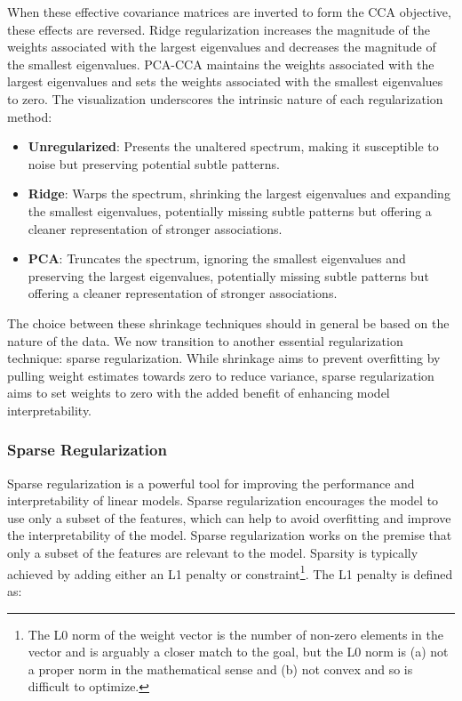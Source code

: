 When these effective covariance matrices are inverted to form the CCA objective, these effects are reversed.
Ridge regularization increases the magnitude of the weights associated with the largest eigenvalues and decreases the magnitude of the smallest eigenvalues.
PCA-CCA maintains the weights associated with the largest eigenvalues and sets the weights associated with the smallest eigenvalues to zero.
The visualization underscores the intrinsic nature of each regularization method:
\begin{itemize}
    \item \textbf{Unregularized}: Presents the unaltered spectrum, making it susceptible to noise but preserving potential subtle patterns.
    \item \textbf{Ridge}: Warps the spectrum, shrinking the largest eigenvalues and expanding the smallest eigenvalues, potentially missing subtle patterns but offering a cleaner representation of stronger associations.
    \item \textbf{PCA}: Truncates the spectrum, ignoring the smallest eigenvalues and preserving the largest eigenvalues, potentially missing subtle patterns but offering a cleaner representation of stronger associations.
\end{itemize}
The choice between these shrinkage techniques should in general be based on the nature of the data.
We now transition to another essential regularization technique: sparse regularization.
While shrinkage aims to prevent overfitting by pulling weight estimates towards zero to reduce variance, sparse regularization aims to set \gls{weights} to zero with the added benefit of enhancing model interpretability.

\subsubsection{Sparse Regularization}

Sparse regularization is a powerful tool for improving the performance and interpretability of linear models.
Sparse regularization encourages the model to use only a subset of the features, which can help to avoid overfitting and improve the interpretability of the model.
Sparse regularization works on the premise that only a subset of the features are relevant to the model.
Sparsity is typically achieved by adding either an L1 penalty or constraint\footnote{The L0 norm of the weight vector is the number of non-zero elements in the vector and is arguably a closer match to the goal, but the L0 norm is (a) not a proper norm in the mathematical sense and (b) not convex and so is difficult to optimize.}.
The L1 penalty is defined as:

